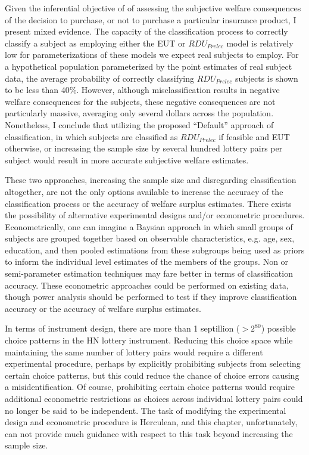 \documentclass[../main.tex]{subfiles}
\begin{document}
Given the inferential objective of \textcite{Harrison2016} of assessing the subjective welfare consequences of the decision to purchase, or not to purchase a particular insurance product, I present mixed evidence.
The capacity of the classification process to correctly classify a subject as employing either the EUT or $\mathit{RDU_{Prelec}}$ model is relatively low for parameterizations of these models we expect real subjects to employ.
For a hypothetical population parameterized by the point estimates of real subject data, the average probability of correctly classifying $\mathit{RDU_{Prelec}}$ subjects is shown to be less than 40\%.
However, although misclassification results in negative welfare consequences for the subjects, these negative consequences are not particularly massive, averaging only several dollars across the population.
Nonetheless, I conclude that utilizing the proposed \enquote{Default} approach of classification, in which subjects are classified as $\mathit{RDU_{Prelec}}$ if feasible and EUT otherwise, or increasing the sample size by several hundred lottery pairs per subject would result in more accurate subjective welfare estimates.

These two approaches, increasing the sample size and disregarding classification altogether, are not the only options available to increase the accuracy of the classification process or the accuracy of welfare surplus estimates.
There exists the possibility of alternative experimental designs and/or econometric procedures.
Econometrically, one can imagine a Baysian approach in which small groups of subjects are grouped together based on observable characteristics, e.g. age, sex, education, and then pooled estimations from these subgroups being used as priors to inform the individual level estimates of the members of the groups.
Non or semi-parameter estimation techniques may fare better in terms of classification accuracy.
These econometric approaches could be performed on existing data, though power analysis should be performed to test if they improve classification accuracy or the accuracy of welfare surplus estimates.

In terms of instrument design, there are more than 1 septillion ($> 2^{80}$) possible choice patterns in the HN lottery instrument.
Reducing this choice space while maintaining the same number of lottery pairs would require a different experimental procedure, perhaps by explicitly prohibiting subjects from selecting certain choice patterns, but this could reduce the chance of choice errors causing a misidentification.
Of course, prohibiting certain choice patterns would require additional econometric restrictions as choices across individual lottery pairs could no longer be said to be independent.
The task of modifying the experimental design and econometric procedure is Herculean, and this chapter, unfortunately, can not provide much guidance with respect to this task beyond increasing the sample size.
\end{document}
